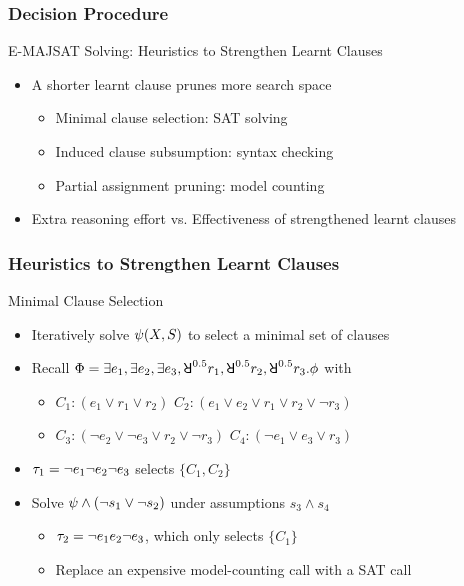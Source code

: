 \begin{frame}
    \frametitle{Decision Procedure}
    \begin{block}{E-MAJSAT Solving: Heuristics to Strengthen Learnt Clauses}
        \begin{itemize}
            \item A shorter learnt clause prunes more search space
                  \pause
                  \begin{itemize}
                      \item Minimal clause selection: SAT solving
                            \pause
                      \item Induced clause subsumption: syntax checking
                            \pause
                      \item Partial assignment pruning: model counting
                            \pause
                  \end{itemize}
            \item Extra reasoning effort vs. Effectiveness of strengthened learnt clauses
        \end{itemize}
    \end{block}
\end{frame}

\begin{frame}
    \frametitle{Heuristics to Strengthen Learnt Clauses}
    \begin{block}{Minimal Clause Selection}
        \begin{itemize}
            \item Iteratively solve $\psi(X,S)$ to select a minimal set of clauses
                  \pause
            \item Recall $\Qf=\exists e_1,\exists e_2,\exists e_3,\random{0.5} r_1,\random{0.5} r_2,\random{0.5} r_3.\pf$ with
                  \begin{itemize}
                      \item[] $C_1: (e_1 \lor r_1 \lor r_2)$ $C_2: (e_1 \lor e_2 \lor r_1 \lor r_2 \lor \lnot r_3)$
                      \item[] $C_3: (\lnot e_2 \lor \lnot e_3 \lor r_2 \lor \lnot r_3)$ $C_4: (\lnot e_1 \lor e_3 \lor r_3)$
                  \end{itemize}
                  \pause
            \item $\tau_1=\lnot e_1 \lnot e_2 \lnot e_3$ selects $\{C_1,C_2\}$
                  \pause
            \item Solve $\psi\land(\lnot s_1\lor\lnot s_2)$ under assumptions $s_3\land s_4$
                  \pause
                  \begin{itemize}
                      \item $\tau_2=\lnot e_1 e_2 \lnot e_3$, which only selects $\{C_1\}$
                            \pause
                      \item Replace an expensive model-counting call with a SAT call
                  \end{itemize}
        \end{itemize}
    \end{block}
\end{frame}

